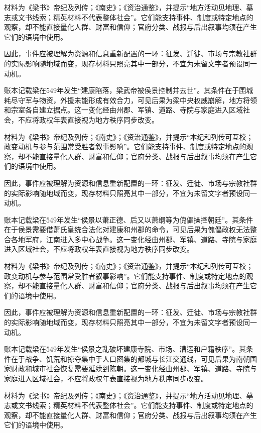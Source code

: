 材料为《梁书》帝纪及列传；《南史》；《资治通鉴》，并提示“地方活动见地理、墓志或文书线索；精英材料不代表整体社会”。它们能支持事件、制度或特定地点的观察，却不能直接量化人群、财富和信仰；官府分类、战报与后出叙事均须在产生它们的语境中使用。

因此，事件应被理解为资源和信息重新配置的一环：征发、迁徙、市场与宗教社群的实际影响随地域而变，现存材料只照亮其中一部分，不宜为未留文字者预设同一动机。

账本记载梁在549年发生“建康陷落，梁武帝被侯景控制并去世”。其条件在于围城耗尽守军与物资，外援未能形成有效合力，可见后果为梁中央权威崩解，地方将领和宗室各自建立据点。这一变化经由州郡、军镇、道路、寺院与家庭进入区域社会，不应将政权年表直接视为地方秩序同步改变。

材料为《梁书》帝纪及列传；《南史》；《资治通鉴》，并提示“本纪和列传可互校；政变动机与参与范围常受胜者叙事影响”。它们能支持事件、制度或特定地点的观察，却不能直接量化人群、财富和信仰；官府分类、战报与后出叙事均须在产生它们的语境中使用。

因此，事件应被理解为资源和信息重新配置的一环：征发、迁徙、市场与宗教社群的实际影响随地域而变，现存材料只照亮其中一部分，不宜为未留文字者预设同一动机。

账本记载梁在549年发生“侯景以萧正德、后又以萧纲等为傀儡操控朝廷”。其条件在于侯景需要借萧氏皇统合法化对建康和州郡的命令，可见后果为傀儡政权无法整合各地军府，江南进入多中心战争。这一变化经由州郡、军镇、道路、寺院与家庭进入区域社会，不应将政权年表直接视为地方秩序同步改变。

材料为《梁书》帝纪及列传；《南史》；《资治通鉴》，并提示“本纪和列传可互校；政变动机与参与范围常受胜者叙事影响”。它们能支持事件、制度或特定地点的观察，却不能直接量化人群、财富和信仰；官府分类、战报与后出叙事均须在产生它们的语境中使用。

因此，事件应被理解为资源和信息重新配置的一环：征发、迁徙、市场与宗教社群的实际影响随地域而变，现存材料只照亮其中一部分，不宜为未留文字者预设同一动机。

账本记载梁在549年发生“侯景之乱破坏建康寺院、市场、漕运和户籍秩序”。其条件在于战争、饥荒和掠夺集中于人口密集的都城与长江交通线，可见后果为南朝国家财政和城市社会恢复需要延续到陈朝。这一变化经由州郡、军镇、道路、寺院与家庭进入区域社会，不应将政权年表直接视为地方秩序同步改变。

材料为《梁书》帝纪及列传；《南史》；《资治通鉴》，并提示“地方活动见地理、墓志或文书线索；精英材料不代表整体社会”。它们能支持事件、制度或特定地点的观察，却不能直接量化人群、财富和信仰；官府分类、战报与后出叙事均须在产生它们的语境中使用。

